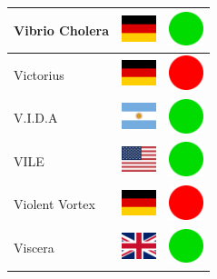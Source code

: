 \documentclass[12pt, a4paper, twoside]{report}
\begin{document}
\begin{center}
\begin{longtable}{|p{5cm}|p{2cm}|p{2cm}|}
 Vibrio Cholera                                             & \includegraphics[width=1cm]{../img/flags/de} &   \includegraphics[width=1cm]{../likes/y} \\ \hline
 Victorius                                                  & \includegraphics[width=1cm]{../img/flags/de} &   \includegraphics[width=1cm]{../likes/n} \\ \hline
 V.I.D.A                                                    & \includegraphics[width=1cm]{../img/flags/ar} &   \includegraphics[width=1cm]{../likes/y} \\ \hline
 VILE                                                       & \includegraphics[width=1cm]{../img/flags/us} &   \includegraphics[width=1cm]{../likes/y} \\ \hline
 Violent Vortex                                             & \includegraphics[width=1cm]{../img/flags/de} &   \includegraphics[width=1cm]{../likes/n} \\ \hline
 Viscera                                                    & \includegraphics[width=1cm]{../img/flags/gb} &   \includegraphics[width=1cm]{../likes/y} \\ \hline

\end{longtable}
\end{center}
\end{document}
